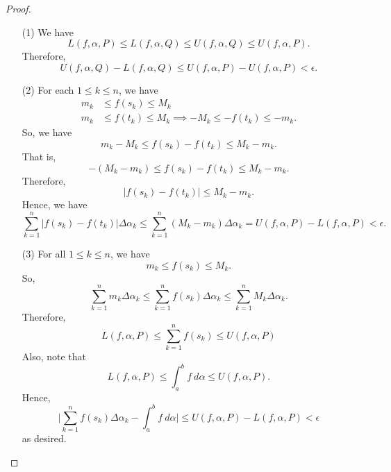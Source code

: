 \begin{proof}
\begin{enumerate}
    \item[(1)] We have 
        \[  L(f,\alpha, P) \leq L(f,\alpha, Q ) \leq U(f,\alpha, Q) \leq U(f,\alpha, P). \]
        Therefore, 
        \[  U(f,\alpha, Q ) - L(f,\alpha,Q) \leq U(f,\alpha, P) - U(f,\alpha, P) < \epsilon. \]
    \item[(2)] For each \( 1 \leq k \leq n  \), we have 
        \begin{align*}
            {m}_{k } &\leq f({s}_{k}) \leq {M}_{k} \\
            {m}_{k}&\leq f({t}_{k}) \leq {M}_{k} \implies - {M}_{k } \leq - f({t}_{k}) \leq - {m}_{k}.
        \end{align*}
        So, we have 
        \[  {m}_{k } - {M}_{k } \leq f({s}_{k}) - f({t}_{k}) \leq {M}_{k } - {m}_{k}. \]
        That is, 
        \[  - ({M}_{k } - {m}_{k}) \leq f({s}_{k}) - f({t}_{k}) \leq {M}_{k } - {m}_{k}. \]
        Therefore, 
        \[  | f({s}_{k}) - f({t}_{k})  | \leq {M}_{k } - {m}_{k}. \]
        Hence, we have 
        \[ \sum_{ k=1  }^{ n } | f({s}_{k}) - f({t}_{k}) |  \Delta {\alpha}_{k } \leq \sum_{ k=1  }^{ n } ({M}_{k } - {m}_{k}) \Delta {\alpha}_{k } = U(f,\alpha, P) - L(f,\alpha,P) < \epsilon. \]
    \item[(3)] For all \( 1 \leq k \leq n  \), we have 
        \[  {m}_{k } \leq f({s}_{k}) \leq {M}_{k }. \]
        So, 
        \[  \sum_{ k=1  }^{ n } {m}_{k } \Delta {\alpha}_{k } \leq \sum_{ k=1  }^{ n } f({s}_{k}) \Delta {\alpha}_{k } \leq \sum_{ k=1  }^{ n } {M}_{k } \Delta {\alpha}_{k }. \]
        Therefore, 
        \[  L(f,\alpha, P) \leq \sum_{ k=1  }^{ n } f({s}_{k}) \leq U(f,\alpha,P) \tag{I} \]
        Also, note that 
        \[  L(f,\alpha,P) \leq \int_{ a }^{ b }  f  \ d \alpha \leq U(f,\alpha, P). \tag{II} \]
        Hence,
        \[  \Big| \sum_{ k=1  }^{ n } f({s}_{k}) \Delta {\alpha}_{k } - \int_{ a }^{ b }  f \ d \alpha \Big|  \leq U(f,\alpha, P) - L(f,\alpha, P) < \epsilon \]
        as desired.
\end{enumerate}
\end{proof}

